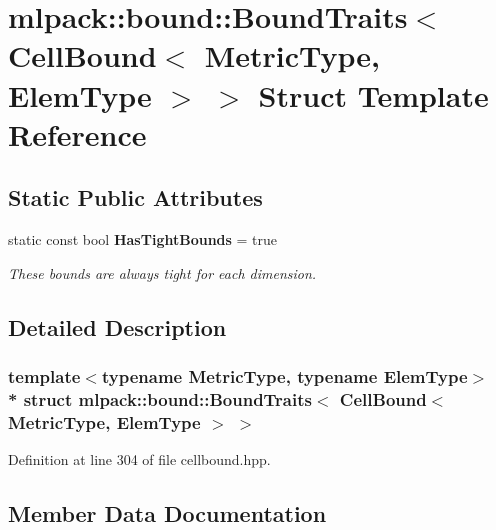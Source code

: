\section{mlpack\+:\+:bound\+:\+:Bound\+Traits$<$ Cell\+Bound$<$ Metric\+Type, Elem\+Type $>$ $>$ Struct Template Reference}
\label{structmlpack_1_1bound_1_1BoundTraits_3_01CellBound_3_01MetricType_00_01ElemType_01_4_01_4}
\subsection*{Static Public Attributes}
\begin{DoxyCompactItemize}
\item 
static const bool {\bf Has\+Tight\+Bounds} = true
\begin{DoxyCompactList}\small\item\em These bounds are always tight for each dimension. \end{DoxyCompactList}\end{DoxyCompactItemize}


\subsection{Detailed Description}
\subsubsection*{template$<$typename Metric\+Type, typename Elem\+Type$>$\\*
struct mlpack\+::bound\+::\+Bound\+Traits$<$ Cell\+Bound$<$ Metric\+Type, Elem\+Type $>$ $>$}



Definition at line 304 of file cellbound.\+hpp.



\subsection{Member Data Documentation}
